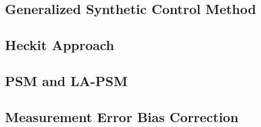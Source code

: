 \documentclass{article}
\begin{document}
\subsection{Generalized Synthetic Control Method}

\subsection{Heckit Approach}

\subsection{PSM and LA-PSM}

\subsection{Measurement Error Bias Correction}

\pagebreak


% 
\end{document}
